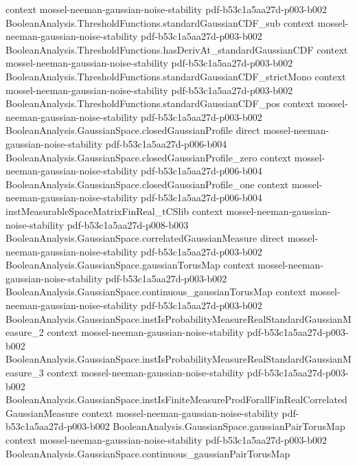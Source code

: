 \begin{theorem}
  {context}
  {mossel-neeman-gaussian-noise-stability}
  {pdf-b53c1a5aa27d-p003-b002}
\proofstep
  {BooleanAnalysis.ThresholdFunctions.standardGaussianCDF_sub}
  {context}
  {mossel-neeman-gaussian-noise-stability}
  {pdf-b53c1a5aa27d-p003-b002}
\proofstep
  {BooleanAnalysis.ThresholdFunctions.hasDerivAt_standardGaussianCDF}
  {context}
  {mossel-neeman-gaussian-noise-stability}
  {pdf-b53c1a5aa27d-p003-b002}
\proofstep
  {BooleanAnalysis.ThresholdFunctions.standardGaussianCDF_strictMono}
  {context}
  {mossel-neeman-gaussian-noise-stability}
  {pdf-b53c1a5aa27d-p003-b002}
\proofstep
  {BooleanAnalysis.ThresholdFunctions.standardGaussianCDF_pos}
  {context}
  {mossel-neeman-gaussian-noise-stability}
  {pdf-b53c1a5aa27d-p003-b002}
\proofstep
  {BooleanAnalysis.GaussianSpace.closedGaussianProfile}
  {direct}
  {mossel-neeman-gaussian-noise-stability}
  {pdf-b53c1a5aa27d-p006-b004}
\proofstep
  {BooleanAnalysis.GaussianSpace.closedGaussianProfile_zero}
  {context}
  {mossel-neeman-gaussian-noise-stability}
  {pdf-b53c1a5aa27d-p006-b004}
\proofstep
  {BooleanAnalysis.GaussianSpace.closedGaussianProfile_one}
  {context}
  {mossel-neeman-gaussian-noise-stability}
  {pdf-b53c1a5aa27d-p006-b004}
\proofstep
  {instMeasurableSpaceMatrixFinReal_tCSlib}
  {context}
  {mossel-neeman-gaussian-noise-stability}
  {pdf-b53c1a5aa27d-p008-b003}
\proofstep
  {BooleanAnalysis.GaussianSpace.correlatedGaussianMeasure}
  {direct}
  {mossel-neeman-gaussian-noise-stability}
  {pdf-b53c1a5aa27d-p003-b002}
\proofstep
  {BooleanAnalysis.GaussianSpace.gaussianTorusMap}
  {context}
  {mossel-neeman-gaussian-noise-stability}
  {pdf-b53c1a5aa27d-p003-b002}
\proofstep
  {BooleanAnalysis.GaussianSpace.continuous_gaussianTorusMap}
  {context}
  {mossel-neeman-gaussian-noise-stability}
  {pdf-b53c1a5aa27d-p003-b002}
\proofstep
  {BooleanAnalysis.GaussianSpace.instIsProbabilityMeasureRealStandardGaussianMeasure_2}
  {context}
  {mossel-neeman-gaussian-noise-stability}
  {pdf-b53c1a5aa27d-p003-b002}
\proofstep
  {BooleanAnalysis.GaussianSpace.instIsProbabilityMeasureRealStandardGaussianMeasure_3}
  {context}
  {mossel-neeman-gaussian-noise-stability}
  {pdf-b53c1a5aa27d-p003-b002}
\proofstep
  {BooleanAnalysis.GaussianSpace.instIsFiniteMeasureProdForallFinRealCorrelatedGaussianMeasure}
  {context}
  {mossel-neeman-gaussian-noise-stability}
  {pdf-b53c1a5aa27d-p003-b002}
\proofstep
  {BooleanAnalysis.GaussianSpace.gaussianPairTorusMap}
  {context}
  {mossel-neeman-gaussian-noise-stability}
  {pdf-b53c1a5aa27d-p003-b002}
\proofstep
  {BooleanAnalysis.GaussianSpace.continuous_gaussianPairTorusMap}

\end{theorem}
